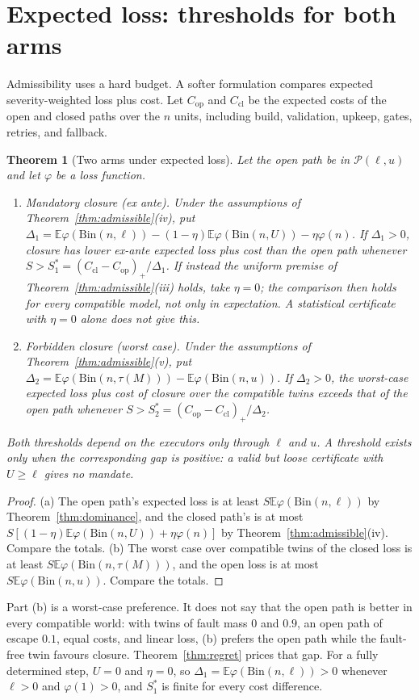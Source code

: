 \documentclass[11pt]{article}
\newtheorem{theorem}{Theorem}
\theoremstyle{definition}
\theoremstyle{remark}
\newcommand{\E}{\mathbb E}
\newcommand{\Bin}{\mathrm{Bin}}
\begin{document}
\section{Expected loss: thresholds for both arms}\label{sec:arms}
Admissibility uses a hard budget. A softer formulation compares expected severity-weighted loss plus
cost. Let $C_{\mathrm{op}}$ and $C_{\mathrm{cl}}$ be the expected costs of the open and closed paths
over the $n$ units, including build, validation, upkeep, gates, retries, and fallback.

\begin{theorem}[Two arms under expected loss]\label{thm:arms}
Let the open path be in $\mathcal P(\ell,u)$ and let $\varphi$ be a loss function.
\begin{enumerate}[label=(\alph*),itemsep=2pt]
\item \emph{Mandatory closure (ex ante).} Under the assumptions of
Theorem~\ref{thm:admissible}(iv), put
$\Delta_1=\E\varphi(\Bin(n,\ell))-(1-\eta)\E\varphi(\Bin(n,U))-\eta\varphi(n)$. If $\Delta_1>0$,
closure has lower ex-ante expected loss plus cost than the open path whenever
$S>S_1^\ast=(C_{\mathrm{cl}}-C_{\mathrm{op}})_+/\Delta_1$. If instead the uniform premise of
Theorem~\ref{thm:admissible}(iii) holds, take $\eta=0$; the comparison then holds for every compatible
model, not only in expectation. A statistical certificate with $\eta=0$ alone does not give this.
\item \emph{Forbidden closure (worst case).} Under the assumptions of
Theorem~\ref{thm:admissible}(v), put $\Delta_2=\E\varphi(\Bin(n,\tau(M)))-\E\varphi(\Bin(n,u))$. If
$\Delta_2>0$, the worst-case expected loss plus cost of closure over the compatible twins exceeds that
of the open path whenever $S>S_2^\ast=(C_{\mathrm{op}}-C_{\mathrm{cl}})_+/\Delta_2$.
\end{enumerate}
Both thresholds depend on the executors only through $\ell$ and $u$. A threshold exists only when
the corresponding gap is positive: a valid but loose certificate with $U\ge\ell$ gives no mandate.
\end{theorem}
\begin{proof}
(a) The open path's expected loss is at least $S\E\varphi(\Bin(n,\ell))$ by
Theorem~\ref{thm:dominance}, and the closed path's is at most
$S[(1-\eta)\E\varphi(\Bin(n,U))+\eta\varphi(n)]$ by Theorem~\ref{thm:admissible}(iv). Compare the
totals. (b) The worst case over compatible twins of the closed loss is at least $S\E\varphi(\Bin(n,\tau(M)))$,
and the open loss is at most $S\E\varphi(\Bin(n,u))$. Compare the totals.
\end{proof}
Part (b) is a worst-case preference. It does not say that the open path is better in every
compatible world: with twins of fault mass $0$ and $0.9$, an open path of escape $0.1$, equal costs,
and linear loss, (b) prefers the open path while the fault-free twin favours closure.
Theorem~\ref{thm:regret} prices that gap. For a fully determined step, $U=0$ and $\eta=0$, so
$\Delta_1=\E\varphi(\Bin(n,\ell))>0$ whenever $\ell>0$ and $\varphi(1)>0$, and $S_1^\ast$ is finite
for every cost difference.
\end{document}
